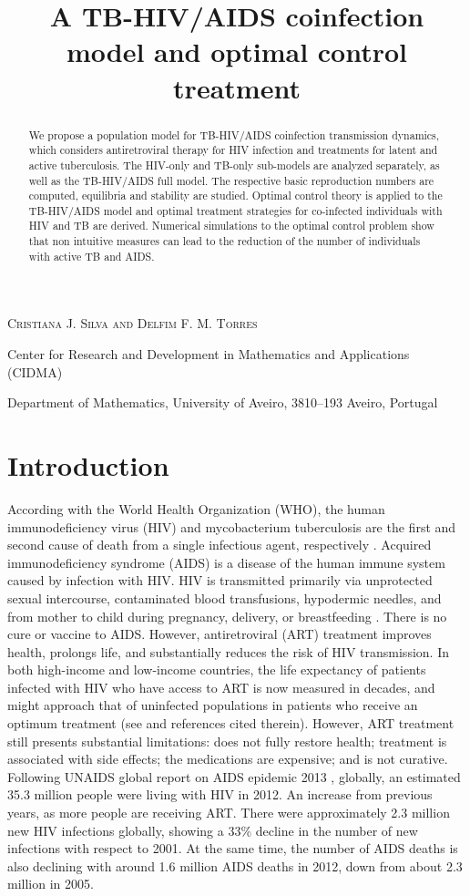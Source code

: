 \documentclass{my_aims}
\title[A TB-HIV/AIDS coinfection model]{A TB-HIV/AIDS coinfection model and optimal control treatment}
\author[C. J. Silva and D. F. M. Torres]{}
\theoremstyle{definition}
\begin{document}
\maketitle

\centerline{\scshape Cristiana J. Silva and Delfim F. M. Torres}
\medskip
{\footnotesize
\centerline{Center for Research and Development in Mathematics and Applications (CIDMA)}
\centerline{Department of Mathematics, University of Aveiro, 3810--193 Aveiro, Portugal}
}

\begin{abstract}
We propose a population model for TB-HIV/AIDS coinfection transmission dynamics,
which considers antiretroviral therapy for HIV infection and treatments for latent
and active tuberculosis. The HIV-only and TB-only sub-models are analyzed separately,
as well as the TB-HIV/AIDS full model. The respective basic reproduction numbers are computed,
equilibria and stability are studied. Optimal control theory is applied to the TB-HIV/AIDS model
and optimal treatment strategies for co-infected individuals with HIV and TB are derived.
Numerical simulations to the optimal control problem show that non intuitive measures
can lead to the reduction of the number of individuals with active TB and AIDS.
\end{abstract}

\section{Introduction}

According with the World Health Organization (WHO),
the human immunodeficiency virus (HIV) and mycobacterium tuberculosis are the first
and second cause of death from a single infectious agent, respectively \cite{TB_WHO_report_2013}.
Acquired immunodeficiency syndrome (AIDS) is a disease of the human immune system caused
by infection with HIV. HIV is transmitted primarily via unprotected sexual intercourse,
contaminated blood transfusions, hypodermic needles, and from mother to child during pregnancy,
delivery, or breastfeeding \cite{Book:Env:Medicine}. There is no cure or vaccine to AIDS.
However, antiretroviral (ART) treatment improves health, prolongs life, and substantially
reduces the risk of HIV transmission. In both high-income and low-income countries,
the life expectancy of patients infected with HIV who have access to ART is now measured
in decades, and might approach that of uninfected populations in patients who receive
an optimum treatment (see \cite{AIDS:chronic:Lancet:2013} and references cited therein).
However, ART treatment still presents substantial limitations: does not fully restore health;
treatment is associated with side effects; the medications are expensive; and is not curative.
Following UNAIDS global report on AIDS epidemic 2013 \cite{UNAIDS_report_2013}, globally,
an estimated 35.3 million people were living with HIV in 2012. An increase from previous years,
as more people are receiving ART. There were approximately 2.3 million new HIV infections globally,
showing a 33\% decline in the number of new infections with respect to 2001. At the same time,
the number of AIDS deaths is also declining with around 1.6 million AIDS deaths in 2012,
down from about 2.3 million in 2005.
\end{document}
